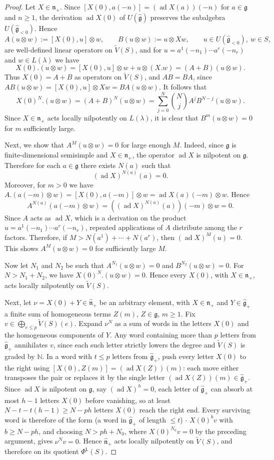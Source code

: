\documentclass[12pt,a4paper,reqno]{amsart}
\numberwithin{equation}{section}
\theoremstyle{definition}
\newcommand{\g}{\mathfrak{g}}
\newcommand{\N}{\mathbb{N}}
\def\L{\mathsf{L}}
\def\la{\lambda}
\def\o{\otimes}
\def\n{\mathfrak{n}}
\def\ad{\operatorname{ad}}
\begin{document}
\begin{proof}
Let $X\in\n_+$. Since $[X(0),a(-n)]=(\ad X(a))(-n)$ for $a\in\g$ and $n\geq 1$, the derivation $\ad X(0)$ of $U(\hat{\g})$ preserves the subalgebra $U(\hat{\g}_{<0})$. Hence
\[
A(u\o w):=[X(0),u]\o w,
\qquad
B(u\o w):=u\o Xw,\qquad u\in U(\hat{\g}_{<0}),\ w\in S,
\]
are well-defined linear operators on $\widetilde{V}(S)$, and for $u=a^1(-n_1)\cdots a^r(-n_r)$ and $w\in L(\la)$ we have
\[
X(0).(u\o w)
=
[X(0),u]\o w + u\o (X.w)=(A+B)(u\o w).
\]
Thus
$
X(0)=A+B$ as operators on $\widetilde{V}(S)$, and $ A B= B A$, since $AB(u\o w)=[X(0),u]\o Xw=BA(u\o w)$.
It follows that
\[
X(0)^N.(u\o w)=(A+B)^N(u\o w)=\sum_{j=0}^N \binom{N}{j} A^j B^{N-j}(u\o w).
\]
Since $X\in\n_+$ acts locally nilpotently on $L(\la)$, it is clear that $B^m(u\o w)=0$ for $m$ sufficiently large.

Next, we show that $A^M(u\o w)=0$ for large enough $M$. Indeed, since $\g$ is finite-dimensional semisimple and $X\in\n_+$, the operator $\ad X$ is nilpotent on $\g$. Therefore for each $a\in\g$ there exists $N(a)$ such that
\[
(\ad X)^{N(a)}(a)=0.
\]
Moreover, for $m>0$ we have
$
A.(a(-m)\o w)
=
[X(0),a(-m)]\o w=\ad X(a)(-m)\o w
$. Hence 
\[
A^{N(a)}(a(-m)\o w)=\left((\ad X)^{N(a)}(a)\right)(-m)\o w=0.
\]
Since $A$ acts as $\ad X$, which is a derivation on the product $u=a^1(-n_1)\cdots a^r(-n_r)$, repeated applications of $A$ distribute among the $r$ factors. Therefore, if $M>N(a^1)+\cdots+N(a^r)$, then $(\ad X)^M(u)=0$. This shows $A^M(u\o w)=0$ for sufficiently large $M$.

Now let $N_1$ and $N_2$ be such that $A^{N_1}(u\o w)=0$ and $B^{N_2}(u\o w)=0$. For $N>N_1+N_2$, we have
$X(0)^N.(u\o w)=0$. Hence every $X(0)$, with $X\in \n_+$, acts locally nilpotently on $\widetilde{V}(S)$.

Next, let $\nu=X(0)+Y\in \hat{\n}_+$ be an arbitrary element, with $X\in\n_+$ and $Y\in\hat{\g}_+$ a finite sum of homogeneous terms $Z(m)$, $Z\in\g$, $m\geq 1$. Fix $v\in\bigoplus_{e\leq p}\widetilde{V}(S)(e)$. Expand $\nu^N$ as a sum of words in the letters $X(0)$ and the homogeneous components of $Y$. Any word containing more than $p$ letters from $\hat{\g}_+$ annihilates $v$, since each such letter strictly lowers the degree and $\widetilde{V}(S)$ is graded by $\N$. In a word with $t\leq p$ letters from $\hat{\g}_+$, push every letter $X(0)$ to the right using $[X(0),Z(m)]=(\ad X(Z))(m)$: each move either transposes the pair or replaces it by the single letter $(\ad X(Z))(m)\in\hat{\g}_+$. Since $\ad X$ is nilpotent on $\g$, say $(\ad X)^{h}=0$, each letter of $\hat{\g}_+$ can absorb at most $h-1$ letters $X(0)$ before vanishing, so at least $N-t-t(h-1)\geq N-ph$ letters $X(0)$ reach the right end. Every surviving word is therefore of the form (a word in $\hat{\g}_+$ of length $\leq t$)$\,\cdot\, X(0)^b v$ with $b\geq N-ph$, and choosing $N>ph+N_0$, where $X(0)^{N_0}v=0$ by the preceding argument, gives $\nu^N v=0$. Hence $\hat{\n}_+$ acts locally nilpotently on $\widetilde{V}(S)$, and therefore on its quotient $\Phi^\L(S)$.


\end{proof}
\end{document}
